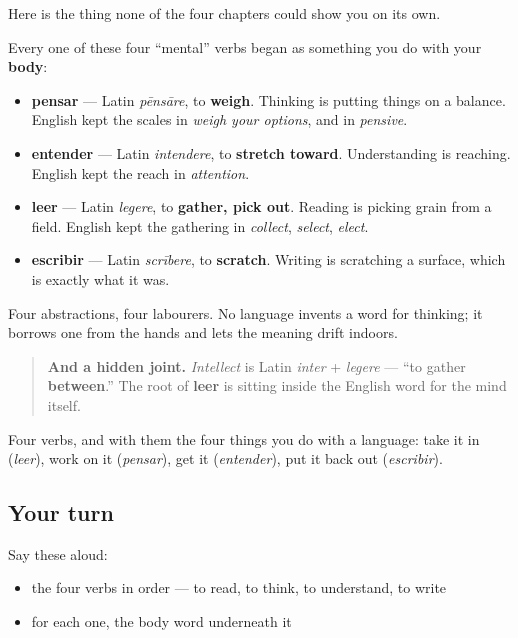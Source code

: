 \begin{cousinweb}
Here is the thing none of the four chapters could show you on its own.

Every one of these four \textquotedblleft{}mental\textquotedblright{} verbs began as something you do with your \textbf{body}:

\begin{itemize}
\raggedright
  \item \textbf{pensar} — Latin \emph{pēnsāre}, to \textbf{weigh}. Thinking is putting things on a balance. English kept the scales in \emph{weigh your options}, and in \emph{pensive}.
  \item \textbf{entender} — Latin \emph{intendere}, to \textbf{stretch toward}. Understanding is reaching. English kept the reach in \emph{attention}.
  \item \textbf{leer} — Latin \emph{legere}, to \textbf{gather, pick out}. Reading is picking grain from a field. English kept the gathering in \emph{collect}, \emph{select}, \emph{elect}.
  \item \textbf{escribir} — Latin \emph{scrībere}, to \textbf{scratch}. Writing is scratching a surface, which is exactly what it was.
\end{itemize}

Four abstractions, four labourers. No language invents a word for thinking; it borrows one from the hands and lets the meaning drift indoors.

\begin{quote}
\textbf{And a hidden joint.} \emph{Intellect} is Latin \emph{inter} + \emph{legere} — \textquotedblleft{}to gather \textbf{between}.\textquotedblright{} The root of \textbf{leer} is sitting inside the English word for the mind itself.
\end{quote}
\end{cousinweb}

\begin{grammarlens}[title={What you've built}]
Four verbs, and with them the four things you do with a language: take it in (\emph{leer}), work on it (\emph{pensar}), get it (\emph{entender}), put it back out (\emph{escribir}).
\end{grammarlens}

\subsection*{Your turn}
Say these aloud:

\begin{itemize}
\raggedright
  \item the four verbs in order — to read, to think, to understand, to write
  \item for each one, the body word underneath it
\end{itemize}

